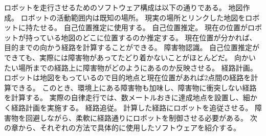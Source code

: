 ロボットを走行させるためのソフトウェア構成は以下の通りである。
地図作成。
ロボットの活動範囲内は既知の場所。
現実の場所とリンクした地図をロボットに持たせる。
自己位置推定に使用する。
自己位置推定。
現在の位置がロボットが持っている地図のどこに位置するのか推定する。
現在位置が分かれば、目的までの向かう経路を計算することができる。
障害物認識。
自己位置推定ができても、実際には障害物があってたどり着かないことがほとんどだ。
向かいたい場所までの経路上に障害物がどのようにあるのか反映させる。
経路計画。
ロボットは地図をもっているので目的地点と現在位置があれば2点間の経路を計算できる。
このとき、環境上にある障害物も加味し、障害物に衝突しない経路を計算する。
実際の自律走行では、数メートルおきに達成地点を設置し、細かく経路計画を実施する。
経路追従。
計算した経路にロボットを追従させる。
障害物を回避しながら、柔軟に経路通りにロボットを制御させる必要がある。
次の章から、それぞれの方法で具体的に使用したソフトウェアを紹介する。